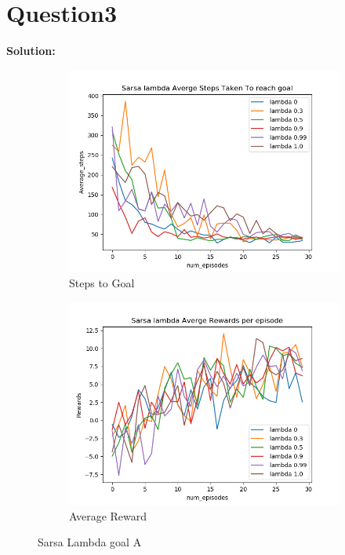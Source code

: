 \documentclass[12pt, letterpaper, twoside]{report}
\begin{document}
\section*{Question3}
\textbf{Solution:}\par
\par
\begin{figure}[h!]
  \centering
  \begin{subfigure}[b]{0.6\linewidth}
    \includegraphics[width=\linewidth]{Sarasa_labda_goal_A_steps.png}
    \caption{Steps to Goal}
  \end{subfigure}
  \begin{subfigure}[b]{0.6\linewidth}
    \includegraphics[width=\linewidth]{Sarasa_labda_goal_A_return.png}
    \caption{Average Reward}
  \end{subfigure}
  \caption{Sarsa Lambda goal A}
  \label{fig:Softamx}
\end{figure}
\end{document}
